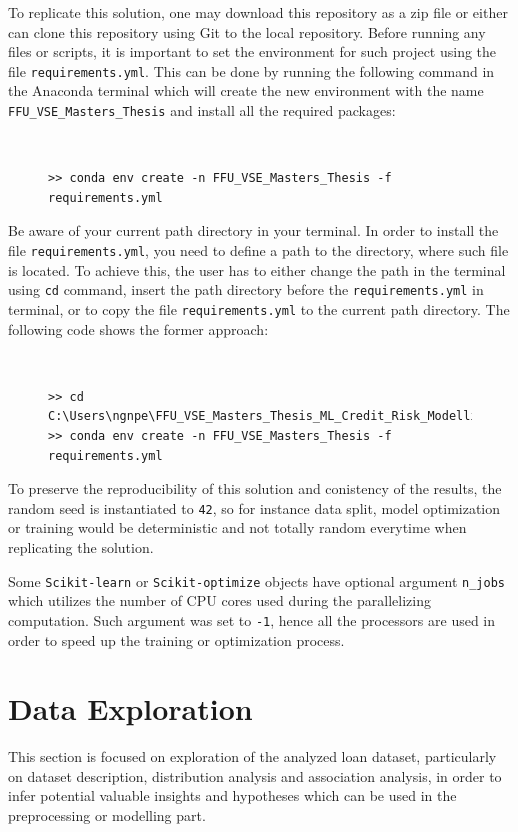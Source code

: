To replicate this solution, one may download this repository as a zip file or either can clone this repository using Git to the local repository. Before running any files or scripts, it is important to set the environment for such project using the file \texttt{requirements.yml}. This can be done by running the following command in the Anaconda terminal which will create the new environment with the name \texttt{FFU\_VSE\_Masters\_Thesis} and install all the required packages:
\begin{figure}[H]
\centering\
{\footnotesize
\begin{verbatim}
>> conda env create -n FFU_VSE_Masters_Thesis -f requirements.yml    
\end{verbatim}
\vspace{-1em}
}
\end{figure}
Be aware of your current path directory in your terminal. In order to install the file \texttt{requirements.yml}, you need to define a path to the directory, where such file is located.
To achieve this, the user has to either change the path in the terminal using \texttt{cd} command, insert the path directory before the \texttt{requirements.yml} in terminal, or to copy the file \texttt{requirements.yml} to the current path directory. The following code shows the former approach:
\begin{figure}[H]
\centering\
{\footnotesize
\begin{verbatim}
>> cd C:\Users\ngnpe\FFU_VSE_Masters_Thesis_ML_Credit_Risk_Modelling
>> conda env create -n FFU_VSE_Masters_Thesis -f requirements.yml   
\end{verbatim}
\vspace{-1em}
}
\end{figure}


To preserve the reproducibility of this solution and conistency of the results, the random seed is instantiated to \texttt{42}, so for instance data split, model optimization or training would be deterministic and not totally random everytime when replicating the solution.

Some \lstinline{Scikit-learn} or \lstinline{Scikit-optimize} objects have optional argument \texttt{n\_jobs} which utilizes the number of CPU cores used during the parallelizing computation. Such argument was set to \texttt{-1}, hence all the processors are used in order to  speed up the training or optimization process.


\section{Data Exploration}
This section is focused on exploration of the analyzed loan dataset, particularly on dataset description, distribution analysis and association analysis, in order to infer potential valuable insights and hypotheses which can be used in the preprocessing or modelling part.

